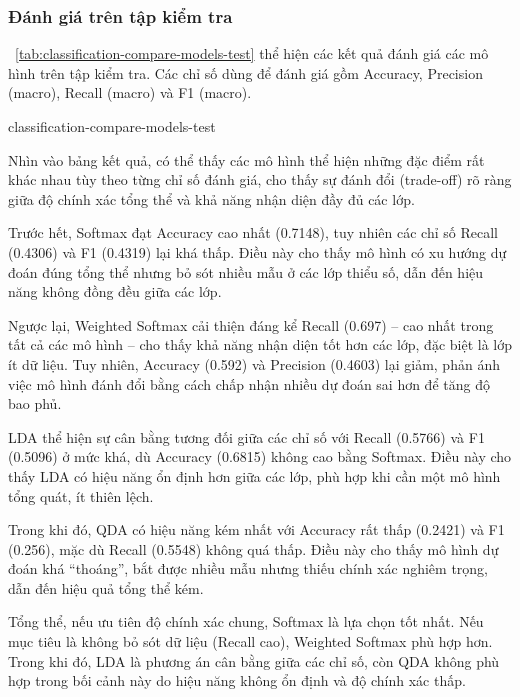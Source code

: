 \subsubsection{Đánh giá trên tập kiểm tra}

\tablename~\ref{tab:classification-compare-models-test} thể hiện các kết quả
đánh giá các mô hình trên tập kiểm tra. Các chỉ số dùng để đánh giá gồm
Accuracy, Precision (macro), Recall (macro) và F1 (macro).

\begin{table}[htbp]
  \centering
  \caption{Kết quả các chỉ số đánh giá các mô hình trên tập kiểm tra}
  {classification-compare-models-test}
  \label{tab:classification-compare-models-test}
\end{table}

Nhìn vào bảng kết quả, có thể thấy các mô hình thể hiện những đặc điểm rất khác
nhau tùy theo từng chỉ số đánh giá, cho thấy sự đánh đổi (trade-off) rõ ràng
giữa độ chính xác tổng thể và khả năng nhận diện đầy đủ các lớp.

Trước hết, Softmax đạt Accuracy cao nhất (0.7148), tuy nhiên các chỉ số Recall
(0.4306) và F1 (0.4319) lại khá thấp. Điều này cho thấy mô hình có xu hướng dự
đoán đúng tổng thể nhưng bỏ sót nhiều mẫu ở các lớp thiểu số, dẫn đến hiệu năng
không đồng đều giữa các lớp.

Ngược lại, Weighted Softmax cải thiện đáng kể Recall (0.697) – cao nhất trong
tất cả các mô hình – cho thấy khả năng nhận diện tốt hơn các lớp, đặc biệt là
lớp ít dữ liệu. Tuy nhiên, Accuracy (0.592) và Precision (0.4603) lại giảm,
phản ánh việc mô hình đánh đổi bằng cách chấp nhận nhiều dự đoán sai hơn để
tăng độ bao phủ.

LDA thể hiện sự cân bằng tương đối giữa các chỉ số với Recall (0.5766) và F1
(0.5096) ở mức khá, dù Accuracy (0.6815) không cao bằng Softmax. Điều này cho
thấy LDA có hiệu năng ổn định hơn giữa các lớp, phù hợp khi cần một mô hình
tổng quát, ít thiên lệch.

Trong khi đó, QDA có hiệu năng kém nhất với Accuracy rất thấp (0.2421) và F1
(0.256), mặc dù Recall (0.5548) không quá thấp. Điều này cho thấy mô hình dự
đoán khá “thoáng”, bắt được nhiều mẫu nhưng thiếu chính xác nghiêm trọng, dẫn
đến hiệu quả tổng thể kém.

Tổng thể, nếu ưu tiên độ chính xác chung, Softmax là lựa chọn tốt nhất. Nếu mục
tiêu là không bỏ sót dữ liệu (Recall cao), Weighted Softmax phù hợp hơn. Trong
khi đó, LDA là phương án cân bằng giữa các chỉ số, còn QDA không phù hợp trong
bối cảnh này do hiệu năng không ổn định và độ chính xác thấp.
